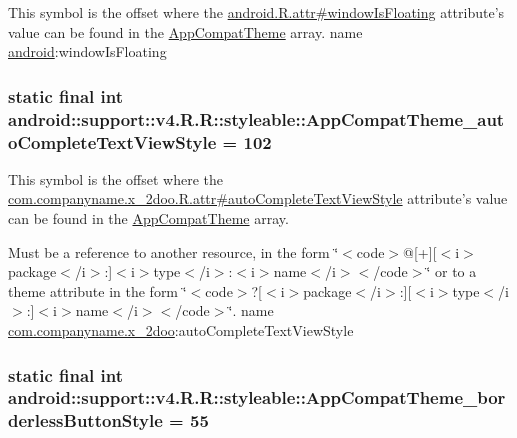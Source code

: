 This symbol is the offset where the \hyperlink{}{android.R.attr\#windowIsFloating} attribute's value can be found in the \hyperlink{classandroid_1_1support_1_1v4_1_1_r_1_1styleable_0873e92ba21076bb5a4aeadeb7f5779f}{AppCompatTheme} array.  name \hyperlink{namespaceandroid}{android}:windowIsFloating \hypertarget{classandroid_1_1support_1_1v4_1_1_r_1_1styleable_8915799c22e82c51ca50dd1d9ff5b50c}{
\subsubsection[{AppCompatTheme\_\-autoCompleteTextViewStyle}]{\setlength{\rightskip}{0pt plus 5cm}static final int android::support::v4.R.R::styleable::AppCompatTheme\_\-autoCompleteTextViewStyle = 102}}
\label{classandroid_1_1support_1_1v4_1_1_r_1_1styleable_8915799c22e82c51ca50dd1d9ff5b50c}


This symbol is the offset where the \hyperlink{classcom_1_1companyname_1_1x__2doo_1_1_r_1_1attr_44901071c8e8c1aa78274fa2d89f51d2}{com.companyname.x\_\-2doo.R.attr\#autoCompleteTextViewStyle} attribute's value can be found in the \hyperlink{classandroid_1_1support_1_1v4_1_1_r_1_1styleable_0873e92ba21076bb5a4aeadeb7f5779f}{AppCompatTheme} array.

Must be a reference to another resource, in the form \char`\"{}$<$code$>$@\mbox{[}+\mbox{]}\mbox{[}$<$i$>$package$<$/i$>$:\mbox{]}$<$i$>$type$<$/i$>$:$<$i$>$name$<$/i$>$$<$/code$>$\char`\"{} or to a theme attribute in the form \char`\"{}$<$code$>$?\mbox{[}$<$i$>$package$<$/i$>$:\mbox{]}\mbox{[}$<$i$>$type$<$/i$>$:\mbox{]}$<$i$>$name$<$/i$>$$<$/code$>$\char`\"{}.  name \hyperlink{namespacecom_1_1companyname_1_1x__2doo}{com.companyname.x\_\-2doo}:autoCompleteTextViewStyle \hypertarget{classandroid_1_1support_1_1v4_1_1_r_1_1styleable_53709ea62e0ea08225a291fefc09a1b5}{
\subsubsection[{AppCompatTheme\_\-borderlessButtonStyle}]{\setlength{\rightskip}{0pt plus 5cm}static final int android::support::v4.R.R::styleable::AppCompatTheme\_\-borderlessButtonStyle = 55}}
\label{classandroid_1_1support_1_1v4_1_1_r_1_1styleable_53709ea62e0ea08225a291fefc09a1b5}



